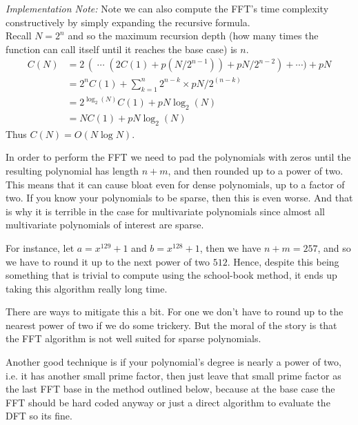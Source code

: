 
\noindent\textit{Implementation Note: }
Note we can also compute the FFT's time complexity constructively by simply expanding the recursive formula.\\

Recall $N = 2^n$ and so the maximum recursion depth (how many times the function can call itself until it reaches the base case) is $n$.
\begin{align*}
C(N) &= 2\,(\;\cdots\; (2C(1) + p(N/2^{n-1})) + pN/2^{n-2}) + \cdots ) + pN\\
     &= 2^{n}C(1) + \sum^n_{k=1} 2^{n-k} \times pN/2^{(n-k)}\\
     &= 2^{\log_2(N)}C(1) + pN\log_2(N)\\
     &= NC(1) + pN\log_2(N)
\end{align*}
Thus $C(N) = O(N \log N)$.

\begin{remark}
    In order to perform the FFT we need to pad the polynomials with zeros until the resulting polynomial has length $n + m$, and then rounded up to a power of two. This means that it can cause bloat even for dense polynomials, up to a factor of two. If you know your polynomials to be sparse, then this is even worse. And that is why it is terrible in the case for multivariate polynomials since almost all multivariate polynomials of interest are sparse.

    For instance, let $a = x^{129} + 1$ and $b = x^{128} + 1$, then we have $n + m = 257$, and so we have to round it up to the next power of two $512$. Hence, despite this being something that is trivial to compute using the school-book method, it ends up taking this algorithm really long time.

    There are ways to mitigate this a bit. For one we don't have to round up to the nearest power of two if we do some trickery. But the moral of the story is that the FFT algorithm is not well suited for sparse polynomials.

    Another good technique is if your polynomial's degree is nearly a power of two, i.e. it has another small prime factor, then just leave that small prime factor as the last FFT base in the method outlined below, because at the base case the FFT should be hard coded anyway or just a direct algorithm to evaluate the DFT so its fine.
\end{remark}

